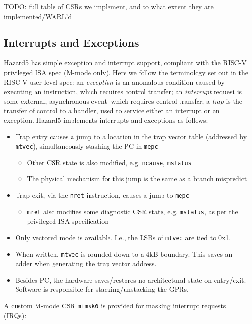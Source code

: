 TODO: full table of CSRs we implement, and to what extent they are implemented/WARL'd

\subsection{Interrupts and Exceptions}

Hazard5 has simple exception and interrupt support, compliant with the RISC-V privileged ISA spec (M-mode only). Here we follow the terminology set out in the RISC-V user-level spec: an {\it exception} is an anomalous condition caused by executing an instruction, which requires control transfer; an {\it interrupt} request is some external, asynchronous event, which requires control transfer; a {\it trap} is the transfer of control to a handler, used to service either an interrupt or an exception. Hazard5 implements interrupts and exceptions as follows:

\begin{itemize}
	\item Trap entry causes a jump to a location in the trap vector table (addressed by {\tt mtvec}), simultaneously stashing the PC in {\tt mepc}
	\begin{itemize}
		\item Other CSR state is also modified, e.g. {\tt mcause}, {\tt mstatus}
		\item The physical mechanism for this jump is the same as a branch mispredict
	\end{itemize}
	\item Trap exit, via the {\tt mret} instruction, causes a jump to {\tt mepc}
	\begin{itemize}
		\item {\tt mret} also modifies some diagnostic CSR state, e.g. {\tt mstatus}, as per the privileged ISA specification
	\end{itemize}
	\item Only vectored mode is available. I.e., the LSBs of {\tt mtvec} are tied to 0x1.
	\item When written, {\tt mtvec} is rounded down to a 4kB boundary. This saves an adder when generating the trap vector address.
	\item Besides PC, the hardware saves/restores no architectural state on entry/exit. Software is responsible for stacking/unstacking the GPRs.
\end{itemize}

A custom M-mode CSR {\tt mimsk0} is provided for masking interrupt requests (IRQs):

